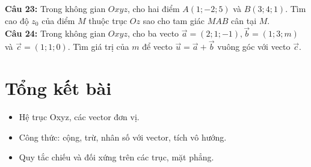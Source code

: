 \documentclass[12pt]{article}
\begin{document}
	
	\vspace{3mm}
	\noindent \textbf{Câu 23:} Trong không gian $Oxyz$, cho hai điểm $A(1; -2; 5)$ và $B(3; 4; 1)$. Tìm cao độ $z_0$ của điểm $M$ thuộc trục $Oz$ sao cho tam giác $MAB$ cân tại $M$. \\
	
	
	\vspace{3mm}
	\noindent \textbf{Câu 24:} Trong không gian $Oxyz$, cho ba vecto $\vec{a} = (2; 1; -1), \vec{b} = (1; 3; m)$ và $\vec{c} = (1; 1; 0)$. Tìm giá trị của $m$ để vecto $\vec{u} = \vec{a} + \vec{b}$ vuông góc với vecto $\vec{c}$. \\
	
	
	\section{Tổng kết bài}
	\begin{tcolorbox}[colback=yellow!10!white, colframe=orange!60!black, fonttitle=\bfseries, title={Tóm tắt kiến thức}]
		\begin{itemize}
			\item Hệ trục Oxyz, các vector đơn vị.
			\item Công thức: cộng, trừ, nhân số với vector, tích vô hướng.
			\item Quy tắc chiếu và đối xứng trên các trục, mặt phẳng.
		\end{itemize}
	\end{tcolorbox}
	
\end{document}
